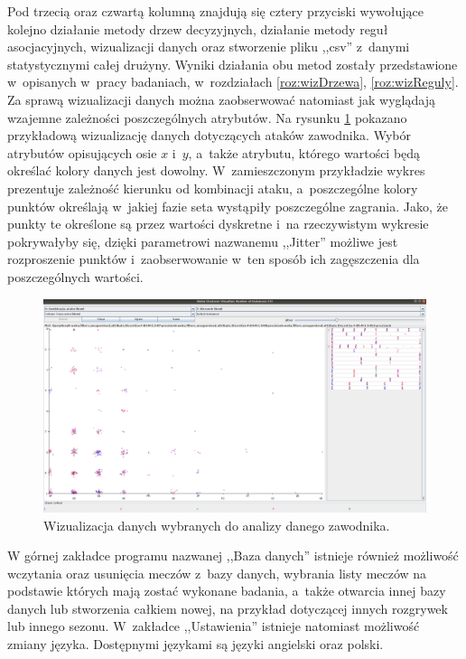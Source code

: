 \documentclass[a4paper,twoside,12pt]{book}
\begin{document}
\begin{appendices}
Pod trzecią oraz czwartą kolumną znajdują się cztery przyciski wywołujące kolejno działanie metody drzew decyzyjnych, działanie metody reguł asocjacyjnych, wizualizacji danych oraz stworzenie pliku ,,csv'' z~danymi statystycznymi całej drużyny. Wyniki działania obu metod zostały przedstawione w~opisanych w~pracy badaniach, w~rozdziałach \ref{roz:wizDrzewa}, \ref{roz:wizReguly}. Za sprawą wizualizacji danych można zaobserwować natomiast jak wyglądają wzajemne zależności poszczególnych atrybutów. Na rysunku \ref{fig:dane} pokazano przykładową wizualizację danych dotyczących ataków zawodnika. Wybór atrybutów opisujących osie $x$ i~$y$, a~także atrybutu, którego wartości będą określać kolory danych jest dowolny. W~zamieszczonym przykładzie wykres prezentuje zależność kierunku od kombinacji ataku, a~poszczególne kolory punktów określają w~jakiej fazie seta wystąpiły poszczególne zagrania. Jako, że punkty te określone są przez wartości dyskretne i~na rzeczywistym wykresie pokrywałyby się, dzięki parametrowi nazwanemu ,,Jitter'' możliwe jest rozproszenie punktów i~zaobserwowanie w~ten sposób ich zagęszczenia dla poszczególnych wartości.

\begin{figure}
\centering
\includegraphics[width=\columnwidth]{dane}
\caption{Wizualizacja danych wybranych do analizy danego zawodnika.}
\label{fig:dane}
\end{figure}

W górnej zakładce programu nazwanej ,,Baza danych'' istnieje również możliwość wczytania oraz usunięcia meczów z~bazy danych, wybrania listy meczów na podstawie których mają zostać wykonane badania, a~także otwarcia innej bazy danych lub stworzenia całkiem nowej, na przykład dotyczącej innych rozgrywek lub innego sezonu. W~zakładce ,,Ustawienia'' istnieje natomiast możliwość zmiany języka. Dostępnymi językami są języki angielski oraz polski.



\end{appendices}
\end{document}
